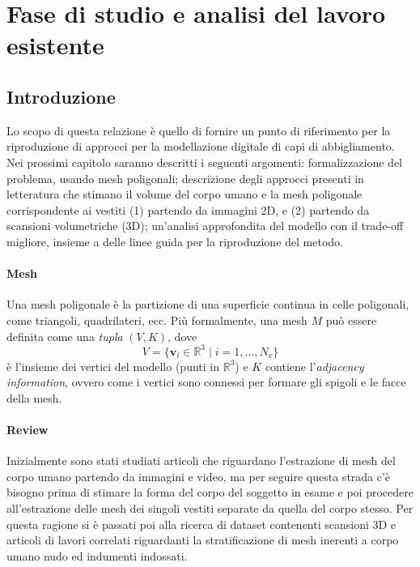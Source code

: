 \section{Fase di studio e analisi del lavoro esistente}
\subsection{Introduzione}
Lo scopo di questa relazione è quello di fornire un punto di riferimento per la riproduzione di approcci per la modellazione digitale di capi di abbigliamento.
Nei prossimi capitolo saranno descritti i seguenti argomenti: formalizzazione del problema, usando mesh poligonali; descrizione degli approcci presenti in letteratura che stimano il volume del corpo umano e la mesh poligonale corrispondente ai vestiti (1) partendo da immagini 2D, e (2) partendo da scansioni volumetriche (3D); un'analisi approfondita del modello con il trade-off migliore, insieme a delle linee guida per la riproduzione del metodo.

\paragraph{Mesh}
Una mesh poligonale è la partizione di una superficie continua in celle poligonali, come triangoli, quadrilateri, ecc.
Più formalmente, una mesh \( M \) può essere definita come una \emph{tupla} \( (V, K) \), dove 
\[
V = \{ \mathbf{v}_i \in \mathbb{R}^3 \mid i = 1, \ldots, N_v \}
\]
è l'insieme dei vertici del modello (punti in \( \mathbb{R}^3 \)) e \( K \) contiene l'\emph{adjacency information}, ovvero come i vertici sono connessi per formare gli spigoli e le facce della mesh.

\paragraph{Review}
Inizialmente sono stati studiati articoli che riguardano l’estrazione di mesh del corpo umano partendo da immagini e video, ma per seguire questa strada c’è bisogno prima di stimare la forma del corpo del soggetto in esame e poi procedere all’estrazione delle mesh dei singoli vestiti separate da quella del corpo stesso. Per questa ragione si è passati poi alla ricerca di dataset contenenti scansioni 3D e articoli di lavori correlati riguardanti la stratificazione di mesh inerenti a corpo umano nudo ed indumenti indossati.

